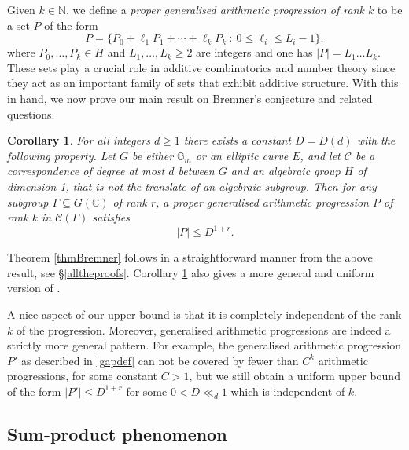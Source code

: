 \documentclass[12pt, reqno]{amsart}
\newcommand{\C}{\mathbb{C}}
\newtheorem{cor}[theorem]{Corollary}
\theoremstyle{remark}
\theoremstyle{definition}
\numberwithin{equation}{section}
\begin{document}
Given $k \in \mathbb{N}$, we define a \emph{proper generalised arithmetic progression of rank $k$} to be a set $P$ of the form 
\begin{equation} \label{gapdef}
P =\{P_0 + \ell_1P_1 + \cdots +\ell_kP_k \  :  \ 0\leq \ell_i \leq L_i-1\} , 
\end{equation}
where $P_0, \dots, P_k \in H$ and $L_1, \dots, L_k \geq 2$ are integers and one has $|P| = L_1 \dots L_k$. These sets play a crucial role in additive combinatorics and number theory since they act as an important family of sets that exhibit additive structure. With this in hand, we now prove our main result on Bremner's conjecture and related questions.


\begin{cor}\label{corBremner} For all integers $d \geq 1$ there exists a constant $D= D(d)$ with the following property. Let $G$ be either $\mathbb{G}_m$ or an elliptic curve $E$, and let $\mathcal{C}$ be a correspondence of degree at most $d$ between $G$ and an algebraic group $H$ of dimension 1, that is not the translate of an algebraic subgroup. Then for any subgroup  $\Gamma \subseteq G(\C)$ of rank $r$, a proper generalised arithmetic progression $P$ of rank $k$ in $\mathcal{C}(\Gamma)$ satisfies 
$$|P| \leq D^{1 + r}. $$
\end{cor}

 Theorem \ref{thmBremner} follows in a straightforward manner from the above result, see \S\ref{alltheproofs}. Corollary \ref{corBremner} also gives a more general and uniform version of \cite[Theorem 6.1]{GFP2021}.   
 
A nice aspect of our upper bound is that it is completely independent of the rank $k$ of the progression. Moreover, generalised arithmetic progressions are indeed a strictly more general pattern. For example, the generalised arithmetic progression $P'$ as described in \eqref{gapdef} can not be covered by fewer than $C^k$ arithmetic progressions, for some constant $C>1$, but we still obtain a uniform upper bound of the form $|P'| \leq D^{1 + r}$ for some $0 < D \ll_d 1$ which is independent of $k$.

\subsection{Sum-product phenomenon}
\end{document}
